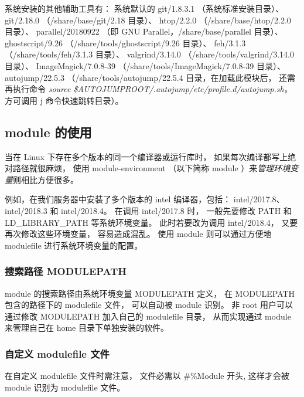 \documentclass[UTF8]{ctexart}
\newcommand{\mynote}[1]{\colorbox{gray!35}{#1}}
\begin{document}
系统安装的其他辅助工具有：\newline
系统默认的 git/1.8.3.1 （系统标准安装目录）、\newline
git/2.18.0 （/share/base/git/2.18 目录）、\newline
htop/2.2.0 （/share/base/htop/2.2.0 目录）、\newline
parallel/20180922 （即 GNU Parallel，/share/base/parallel 目录）、\newline
ghostscript/9.26 （/share/tools/ghostscript/9.26 目录）、\newline
feh/3.1.3 （/share/tools/feh/3.1.3 目录）、\newline
valgrind/3.14.0 （/share/tools/valgrind/3.14.0 目录）、\newline
ImageMagick/7.0.8-39 （/share/tools/ImageMagick/7.0.8-39 目录）、\newline
autojump/22.5.3 （/share/tools/autojump/22.5.4 目录，在加载此模块后，
还需再执行命令 {\em source \$AUTOJUMPROOT/.autojump/etc/profile.d/autojump.sh}，
方可调用 j 命令快速跳转目录）。

\subsection{module 的使用}
当在 Linux 下存在多个版本的同一个编译器或运行库时，
如果每次编译都写上绝对路径就很麻烦，
使用 module-environment （以下简称 module ）来{\em 管理环境变量}则相比方便很多。

例如，在我们服务器中安装了多个版本的 intel 编译器，包括：
intel/2017.8、intel/2018.3 和 intel/2018.4。
在调用 intel/2017.8 时，
一般先要修改 PATH 和 LD\_LIBRARY\_PATH 等系统环境变量。
此时若要改为调用 intel/2018.4，
又要再次修改这些环境变量，
容易造成混乱。
使用 module 则可以通过方便地 modulefile 进行系统环境变量的配置。

\subsubsection{搜索路径 MODULEPATH}
module 的搜索路径由系统环境变量 MODULEPATH 定义，
在 MODULEPATH 包含的路径下的 modulefile 文件，
可以自动被 module 识别。
非 root 用户可以通过修改 MODULEPATH 加入自己的 modulefile 目录，
从而实现通过 module 来管理自己在 home 目录下单独安装的软件。

\subsubsection{自定义 modulefile 文件}
在自定义 modulefile  文件时需注意，
文件必需以 \mynote{\#\%Module} 开头,
这样才会被 module 识别为 modulefile 文件。
\end{document}
